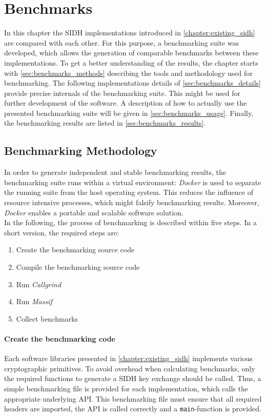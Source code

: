 \chapter{Benchmarks}\label{chapter:benchmarks}
In this chapter the SIDH implementations introduced in \autoref{chapter:existing_sidh} are compared with each other. For this purpose, a benchmarking suite was developed, which allows the generation of comparable benchmarks between these implementations. To get a better understanding of the results, the chapter starts with \autoref{sec:benchmarks_methods} describing the tools and methodology used for benchmarking. The following implementations details of \autoref{sec:benchmarks_details} provide precise internals of the benchmarking suite. This might be used for further development of the software. A description of how to actually use the presented benchmarking suite will be given in \autoref{sec:benchmarks_usage}. Finally, the benchmarking results are listed in \autoref{sec:benchmarks_results}.

\section{Benchmarking Methodology}\label{sec:benchmarks_methods}
In order to generate independent and stable benchmarking results, the benchmarking suite runs within a virtual environment: \textit{Docker} is used to separate the running suite from the host operating system. This reduces the influence of resource intensive processes, which might falsify benchmarking results. Moreover, \textit{Docker} enables a portable and scalable software solution.
\\
In the following, the process of benchmarking is described within five steps. In a short version, the required steps are:

\begin{enumerate}
  \item Create the benchmarking source code
  \item Compile the benchmarking source code
  \item Run \textit{Callgrind}
  \item Run \textit{Massif}
  \item Collect benchmarks
\end{enumerate}

\subsubsection{Create the benchmarking code}
Each software libraries presented in \autoref{chapter:existing_sidh} implements various cryptographic primitives. To avoid overhead when calculating benchmarks, only the required functions to generate a SIDH key exchange should be called. Thus, a simple benchmarking file is provided for each implementation, which calls the appropriate underlying API. This benchmarking file must ensure that all required headers are imported, the API is called correctly and a \texttt{main}-function is provided.

